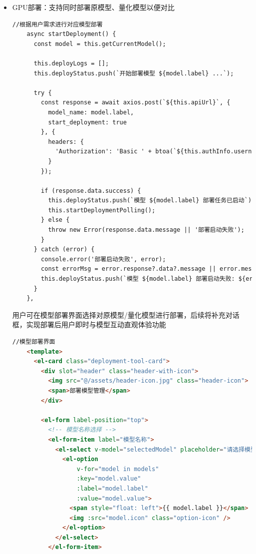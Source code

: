 \documentclass[AutoFakeBold,AutoFakeSlant,language=chinese,degree=bachelor]{sustechthesis}
\begin{document}
\begin{itemize}
\begin{lstlisting}[language=python]
            with open(EVALUATION_LOG, 'a') as f:
                f.write("[INFO] 评估进程已被用户取消\n")
            
            current_eval_process = None
            
            return jsonify({
                'success': True,
                'message': '评估进程已成功取消'
            })
        except Exception as e:
            error_msg = f"取消评估失败: {str(e)}"
            log_error(error_msg, "backend")
            return jsonify({
                'success': False,
                'message': error_msg
            }), 500
    \end{lstlisting}
    
    \item GPU部署：支持同时部署原模型、量化模型以便对比
    \begin{lstlisting}[language=HTML]
    //根据用户需求进行对应模型部署
    async startDeployment() {
      const model = this.getCurrentModel();

      this.deployLogs = [];
      this.deployStatus.push(`开始部署模型 ${model.label} ...`);

      try {
        const response = await axios.post(`${this.apiUrl}`, {
          model_name: model.label,
          start_deployment: true
        }, {
          headers: {
            'Authorization': 'Basic ' + btoa(`${this.authInfo.username}:${this.authInfo.password}`)
          }
        });

        if (response.data.success) {
          this.deployStatus.push(`模型 ${model.label} 部署任务已启动`);
          this.startDeploymentPolling();
        } else {
          throw new Error(response.data.message || '部署启动失败');
        }
      } catch (error) {
        console.error('部署启动失败', error);
        const errorMsg = error.response?.data?.message || error.message;
        this.deployStatus.push(`模型 ${model.label} 部署启动失败: ${errorMsg}`);
      }
    },
    \end{lstlisting}
    用户可在模型部署界面选择对原模型/量化模型进行部署，后续将补充对话框，实现部署后用户即时与模型互动直观体验功能
    \begin{lstlisting}[language=HTML]
    //模型部署界面
    <template>
      <el-card class="deployment-tool-card">
        <div slot="header" class="header-with-icon">
          <img src="@/assets/header-icon.jpg" class="header-icon">
          <span>部署模型管理</span>
        </div>
    
        <el-form label-position="top">
          <!-- 模型名称选择 -->
          <el-form-item label="模型名称">
            <el-select v-model="selectedModel" placeholder="请选择模型">
              <el-option
                  v-for="model in models"
                  :key="model.value"
                  :label="model.label"
                  :value="model.value">
                <span style="float: left">{{ model.label }}</span>
                <img :src="model.icon" class="option-icon" />
              </el-option>
            </el-select>
          </el-form-item>
    

\end{lstlisting}
\end{itemize}
\end{document}
